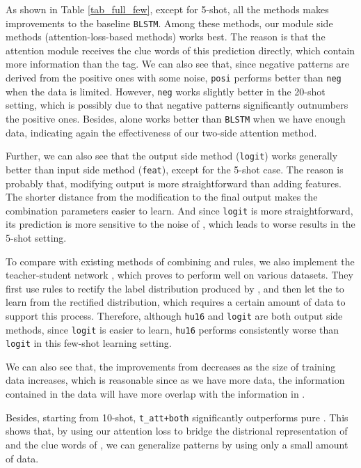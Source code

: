 As shown in Table \ref{tab_full_few}, except for 5-shot, all the methods makes improvements to the baseline \texttt{BLSTM}. 
Among these methods, our \NN module side methods (attention-loss-based methods) works best.
The reason is that the attention module receives the clue words of this prediction directly, which contain more information than the \RE tag.
We can also see that, since negative patterns are derived from the positive ones with some noise, \texttt{posi} performs better than \texttt{neg} when the data is limited.
However, \texttt{neg} works slightly better in the 20-shot setting, which is possibly due to that negative patterns significantly outnumbers the positive ones. 
Besides, \tatt alone works better than \texttt{BLSTM} when we have enough data, indicating again the effectiveness of our two-side attention method.

Further, we can also see that the output side method (\texttt{logit}) works generally better than input side method (\texttt{feat}), except for the 5-shot case.
The reason is probably that, modifying output is more straightforward than adding features. The shorter distance from the modification to the final output makes the combination parameters easier to learn.  
And since \texttt{logit} is more straightforward, its prediction is more sensitive to the noise of \RE, which leads to worse results in the 5-shot setting.

To compare with existing methods of combining \NN and rules, we also implement the teacher-student network \cite{liu2016attention}, which proves to perform well on various datasets. 
They first use \FOL rules to rectify the label distribution produced by \NN, and then let the \NN to learn from the rectified distribution, which requires a certain amount of data to support this process.
Therefore, although \texttt{hu16} and \texttt{logit} are both output side methods, since \texttt{logit} is easier to learn,
\texttt{hu16} performs consistently worse than \texttt{logit} in this few-shot learning setting.

We can also see that, the improvements from \RE decreases as the size of training data increases, 
which is reasonable since as we have more data, the information contained in the data will have more overlap with the information in \RE. 

Besides, starting from 10-shot, \texttt{t\_att+both} significantly outperforms pure \RE.
This shows that, by using our attention loss to bridge the distrional representation of \NN and the clue words of \RE, we can generalize \RE patterns by using only a small amount of data.


